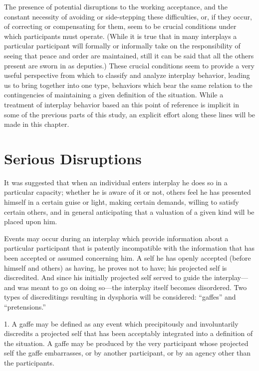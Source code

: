 \documentclass[openany,nobib]{tufte-book}
\begin{document}
\newpage The presence of potential disruptions to the working acceptance, and the
constant necessity of avoiding or side-stepping these difficulties, or,
if they occur, of correcting or compensating for them, seem to be
crucial conditions under which participants must operate. (While it is
true that in many interplays a particular participant will formally or
informally take on the responsibility of seeing that peace and order are
maintained, still it can be said that all the others present are sworn
in as deputies.) These crucial conditions seem to provide a very useful
perspective from which to classify and analyze interplay behavior,
leading us to bring together into one type, behaviors which bear the
same relation to the contingencies of maintaining a given definition of
the situation. While a treatment of interplay behavior based an this
point of reference is implicit in some of the previous parts of this
study, an explicit effort along these lines will be made in this
chapter.

\hypertarget{serious-disruptions}{%
\section{Serious Disruptions}\label{serious-disruptions}}

It was suggested that when an individual enters interplay he does so in
a particular capacity; whether he is aware of it or not, others feel he
has presented himself in a certain guise or light, making certain
demands, willing to satisfy certain others, and in general anticipating
that a valuation of a given kind will be placed upon him.

Events may occur during an interplay which provide information about a
particular participant that is patently incompatible with the
information that has been accepted or assumed concerning him. A self he
has openly accepted (before himself and others) as having, he proves not
to have; his projected self is discredited. And since his initially
projected self served to guide the interplay---and was meant to go on
doing so---the interplay itself becomes disordered. Two types of
discreditings resulting in dysphoria will be considered: ``gaffes'' and
``pretensions.''

1. A gaffe may be defined as any event which precipitously and
involuntarily discredits a projected self that has been acceptably
integrated into a definition of the situation. A gaffe may be produced
by the very participant whose projected self the gaffe embarrasses, or
by another participant, or by an agency other than the participants.
\end{document}
